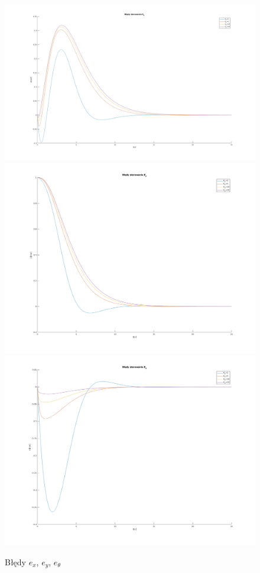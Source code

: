 \documentclass[12pt,a4paper]{article}
\begin{document}
  \begin{figure}[H]
    \centering
    \includegraphics[height=0.33\textheight]{figures/dyn_bledy_k2_ex.png}
    \includegraphics[height=0.33\textheight]{figures/dyn_bledy_k2_ey.png}
    \includegraphics[height=0.33\textheight]{figures/dyn_bledy_k2_eo.png}
    \caption{Błędy $e_x$, $e_y$, $e_\theta$}
    \label{fig:7}
  \end{figure}
\end{document}
